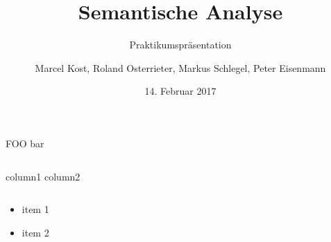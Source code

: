 \documentclass[18pt]{beamer}
\title[]{Semantische Analyse}
\subtitle{Praktikumspräsentation}
\author{Marcel Kost, Roland Osterrieter, Markus Schlegel, Peter Eisenmann}
\date{14. Februar 2017}
\institute{IPD Snelting, Lehrstuhl für Programmierparadigmen}
\begin{document}
\begin{frame}
\titlepage
\end{frame}
\newcommand{\code}{\texttt}

\begin{frame}{FOO \footnotesize bar} \center
	\begin{figure}[htp]
	\end{figure}
	\begin{columns}
		 column1
		 column2
	\end{columns}
	\begin{itemize}
		\item item 1
		\item item 2
	\end{itemize}\ \\
\end{frame}

\end{document}
